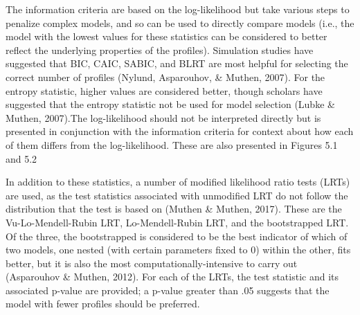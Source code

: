 \documentclass[]{book}
\theoremstyle{definition}
\theoremstyle{definition}
\theoremstyle{definition}
\theoremstyle{remark}
\begin{document}
The information criteria are based on the log-likelihood but take
various steps to penalize complex models, and so can be used to directly
compare models (i.e., the model with the lowest values for these
statistics can be considered to better reflect the underlying properties
of the profiles). Simulation studies have suggested that BIC, CAIC,
SABIC, and BLRT are most helpful for selecting the correct number of
profiles (Nylund, Asparouhov, \& Muthen, 2007). For the entropy
statistic, higher values are considered better, though scholars have
suggested that the entropy statistic not be used for model selection
(Lubke \& Muthen, 2007).The log-likelihood should not be interpreted
directly but is presented in conjunction with the information criteria
for context about how each of them differs from the log-likelihood.
These are also presented in Figures 5.1 and 5.2

In addition to these statistics, a number of modified likelihood ratio
tests (LRTs) are used, as the test statistics associated with unmodified
LRT do not follow the distribution that the test is based on (Muthen \&
Muthen, 2017). These are the Vu-Lo-Mendell-Rubin LRT, Lo-Mendell-Rubin
LRT, and the bootstrapped LRT. Of the three, the bootstrapped is
considered to be the best indicator of which of two models, one nested
(with certain parameters fixed to 0) within the other, fits better, but
it is also the most computationally-intensive to carry out (Asparouhov
\& Muthen, 2012). For each of the LRTs, the test statistic and its
associated p-value are provided; a p-value greater than .05 suggests
that the model with fewer profiles should be preferred.
\end{document}
